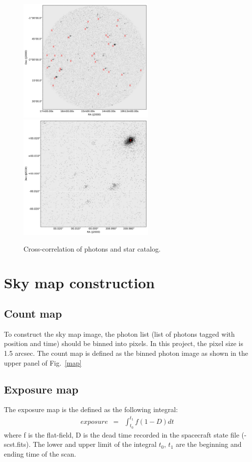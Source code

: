 \documentclass[12pt, preprint]{aastex}
\begin{document}
\begin{figure}[p]
\begin{center}
\includegraphics[width=0.6\textwidth]{figures/slice.pdf}
\includegraphics[width=0.6\textwidth]{figures/corr.pdf}
\end{center}
\caption{%
  \label{slice}
  Cross-correlation of photons and star catalog.
  }
\end{figure}


\section{Sky map construction}
\subsection{Count map}
To construct the sky map image, the photon list (list of photons tagged with position and time) should be binned into pixels. In this project, the pixel size is 1.5 arcsec. The count map is defined as the binned photon image as shown in the upper panel of Fig.~\ref{map}
 
\subsection{Exposure map}
The exposure map is the defined as the following integral:
\begin{eqnarray}
  exposure &=& \int_{t_0}^{t_1}f(1-D)dt
\end{eqnarray}
where f is the flat-field, D is the dead time recorded in the spacecraft state file (-scst.fits). The lower and upper limit of the integral $t_0$, $t_1$ are the beginning and ending time of the scan.
\end{document}
